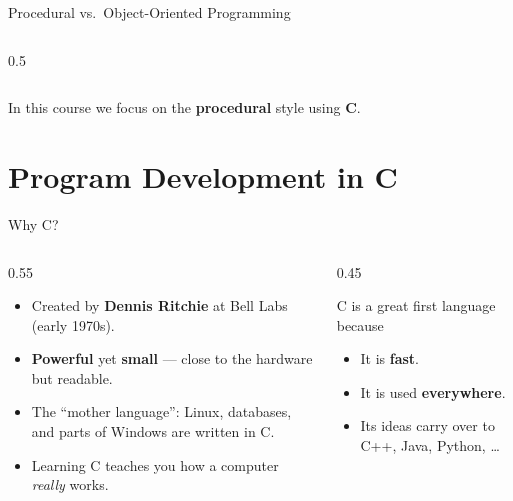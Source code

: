 \documentclass[aspectratio=169]{beamer}
\begin{document}
\begin{frame}{Procedural vs.\ Object-Oriented Programming}
\begin{columns}[T]
\begin{column}{0.5\textwidth}
			\end{column}
		\end{columns}
		\vspace{0.3cm}
		\footnotesize\centering In this course we focus on the \textbf{procedural} style using \textbf{C}.
	\end{frame}
	
	\section{Program Development in C}
	\begin{frame}{Why C?}
		\begin{columns}[T]
			\begin{column}{0.55\textwidth}
				\begin{itemize}
					\item Created by \textbf{Dennis Ritchie} at Bell Labs (early 1970s).
					\item \textbf{Powerful} yet \textbf{small} --- close to the hardware but readable.
					\item The ``mother language'': Linux, databases, and parts of Windows are written in C.
					\item Learning C teaches you how a computer \emph{really} works.
				\end{itemize}
			\end{column}
			\begin{column}{0.45\textwidth}
				\begin{block}{C is a great first language because}
					\begin{itemize}\small
						\item It is \textbf{fast}.
						\item It is used \textbf{everywhere}.
						\item Its ideas carry over to C++, Java, Python, \dots
					\end{itemize}
				\end{block}
			\end{column}
		\end{columns}
	\end{frame}
	
\end{document}
